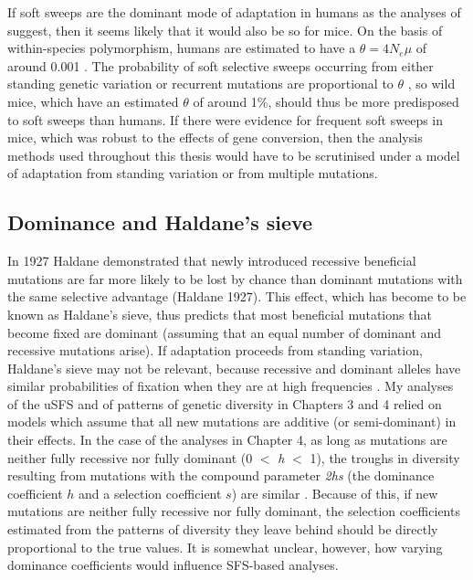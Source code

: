 	If soft sweeps are the dominant mode of adaptation in humans as the analyses of \cite{RN338} suggest, then it seems likely that it would also be so for mice. On the basis of within-species polymorphism, humans are estimated to have a $\theta = 4N_e\mu$ of around 0.001 \citep{RN398}. The probability of soft selective sweeps occurring from either standing genetic variation or recurrent mutations are proportional to $\theta$ \citep{RN336}, so wild mice, which have an estimated $\theta$ of around 1\%, should thus be more predisposed to soft sweeps than humans. If there were evidence for frequent soft sweeps in mice, which was robust to the effects of gene conversion, then the analysis methods used throughout this thesis would have to be scrutinised under a model of adaptation from standing variation or from multiple mutations.
 
  \subsection{Dominance and Haldane's sieve}
 
	In 1927 Haldane demonstrated that newly introduced recessive beneficial mutations are far more likely to be lost by chance than dominant mutations with the same selective advantage (Haldane 1927). This effect, which has become to be known as Haldane's sieve, thus predicts that most beneficial mutations that become fixed are dominant (assuming that an equal number of dominant and recessive mutations arise). If adaptation proceeds from standing variation, Haldane's sieve may not be relevant, because recessive and dominant alleles have similar probabilities of fixation when they are at high frequencies \citep{RN395}. My analyses of the uSFS and of patterns of genetic diversity in Chapters 3 and 4 relied on models which assume that all new mutations are additive (or semi-dominant) in their effects. In the case of the analyses in Chapter 4, as long as mutations are neither fully recessive nor fully dominant (0 $<$ \textit{h} $<$ 1), the troughs in diversity resulting from mutations with the compound parameter \textit{2hs} (the dominance coefficient $h$ and a selection coefficient $s$) are similar \citep{RN396}. Because of this, if new mutations are neither fully recessive nor fully dominant, the selection coefficients estimated from the patterns of diversity they leave behind should be directly proportional to the true values. It is somewhat unclear, however, how varying dominance coefficients would influence SFS-based analyses.
	
